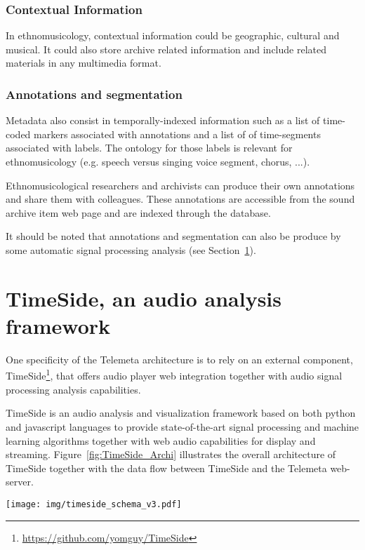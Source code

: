 \documentclass{paper}
\begin{document}
\subsubsection{Contextual Information}
In ethnomusicology, contextual information could be geographic, cultural and musical. It could also store archive related information and include related materials in any multimedia format.

\subsubsection{Annotations and segmentation}
Metadata also consist in temporally-indexed information such as a list of time-coded markers associated with annotations and a list of of time-segments associated with labels. The ontology for those labels is relevant for ethnomusicology (e.g. speech versus singing voice segment, chorus, ...).

Ethnomusicological researchers and archivists can produce their own annotations and share them with colleagues. These annotations are accessible from the sound archive item web page and are indexed through the database.

It should be noted that annotations and segmentation can also be produce by some automatic signal processing analysis (see Section~\ref{sec:TimeSide}).


\section{TimeSide, an audio analysis framework}\label{sec:TimeSide}
One specificity of the Telemeta architecture is to rely on an external component, TimeSide\footnote{\url{https://github.com/yomguy/TimeSide}}, that offers audio player web integration together with audio signal processing analysis capabilities. 

TimeSide is an audio analysis and visualization framework based on both python and javascript languages to provide state-of-the-art signal processing and machine learning algorithms together with web audio capabilities for display and streaming.
Figure~\ref{fig:TimeSide_Archi} illustrates the overall architecture of TimeSide together with the data flow between TimeSide and the Telemeta web-server.

\begin{figure*}[htbp]
  \centering
  \texttt{[image: img/timeside\_schema\_v3.pdf]}
  \caption{TimeSide engine architecture and data flow with Telemeta web-server}\label{fig:TimeSide_Archi}
\end{figure*}
\end{document}
